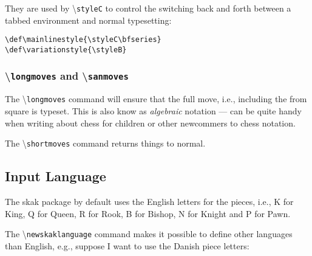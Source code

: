 \documentclass[10pt]{article}
\newcommand{\package}[1]{\textsf{#1}}
\newcommand{\command}[1]{\textbackslash\texttt{#1}}
\begin{document}
They are used by \command{styleC} to control the switching back and
forth between a tabbed environment and normal typesetting:

\begin{verbatim}
\def\mainlinestyle{\styleC\bfseries}
\def\variationstyle{\styleB}
\end{verbatim}



\subsubsection{\command{longmoves} and \command{sanmoves}}
\label{sec:commandlongmove}

The \command{longmoves} command will ensure that the full move, i.e., including the from
square is typeset. This is also know as \emph{algebraic} notation ---
can be quite handy when writing about chess for children or other
newcommers to chess notation.

\begin{LTXexample}
\newgame
\longmoves

\end{LTXexample}

\shortmoves

The \command{shortmoves} command returns things to normal.


\subsection{Input Language}
\label{sec:input-language}

The \package{skak} package by default uses the English letters for the
pieces, i.e., K for King, Q for Queen, R for Rook, B for Bishop, N for
Knight and P for Pawn.

The \command{newskaklanguage} command makes it possible to define
other languages than English, e.g., suppose I want to use the Danish
piece letters:

\begin{LTXexample}

\skaklanguage[danish]

\newgame
{} 
\end{LTXexample}
\end{document}
